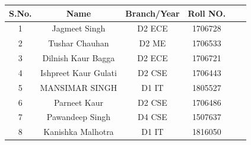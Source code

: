 \documentclass[12pt, a4 paper]{article}
\begin{document}
\begin{table}[h!]
  \begin{center}
    \begin{tabular}{|c|c|c|c|c|c|} 
    \toprule %
      \textbf{S.No.} & \textbf{Name} & \textbf{Branch/Year} & \textbf{Roll NO.} \\
      \midrule %
      1 & Jagmeet Singh        & D2 ECE & 1706728 \\
      2	& Tushar Chauhan       & D2 ME	& 1706533 \\
      3	& Dilnish Kaur Bagga   & D2 ECE	& 1706721 \\
      4	& Ishpreet Kaur Gulati & D2 CSE	& 1706443 \\
      5	& MANSIMAR SINGH	   & D1 IT	& 1805527 \\
      6	& Parneet Kaur	       & D2 CSE & 1706486 \\
      7	& Pawandeep Singh	   & D4 CSE	& 1507637 \\
      8	& Kanishka Malhotra	   & D1 IT	& 1816050 \\

      \bottomrule %
    \end{tabular}
  \end{center}
\end{table}

\newpage
\end{document}
